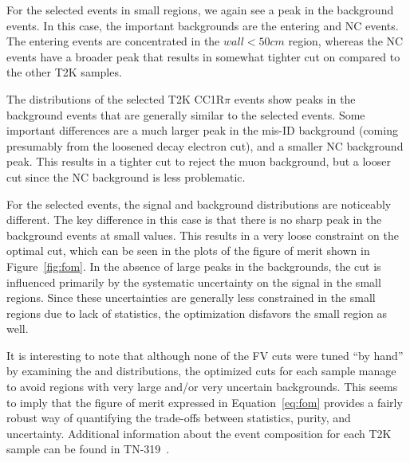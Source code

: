 For the selected \nue events in small \wall regions, we again see a peak in the
background events.  In this case, the important backgrounds are the entering and
NC events. The entering events are concentrated in the $wall < 50 cm$ region,
whereas the NC events have a broader peak that results in somewhat tighter cut
on \wall compared to the other T2K samples.

The distributions of the selected T2K \nue CC1R$\pi$ events show peaks in the
background events that are generally similar to the selected \nue events.  Some
important differences are a much larger peak in the mis-ID background (coming
presumably from the loosened decay electron cut), and a smaller NC background
peak.  This results in a tighter \towall cut to reject the muon background, but
a looser \wall cut since the NC background is less problematic.

For the selected \numu events, the signal and background distributions are
noticeably different.  The key difference in this case is that there is no
sharp peak in the background events at small \towall values.  This results in a
very loose constraint on the optimal \towall cut, which can be seen in the
plots of the figure of merit shown in Figure~\ref{fig:fom}.  In the absence of
large peaks in the backgrounds, the \numu \towall cut is influenced primarily by the
systematic uncertainty on the signal in the small \towall regions.  Since these
uncertainties are generally less constrained in the small \towall regions due
to lack of statistics, the optimization disfavors the small \towall region as
well.

It is interesting to note that although none of the FV cuts were tuned ``by
hand'' by examining the \towall and \wall distributions, the optimized cuts for
each sample manage to avoid regions with very large and/or very uncertain
backgrounds.  This seems to imply that the figure of merit expressed in
Equation~\ref{eq:fom} provides a fairly robust way of quantifying the
trade-offs between statistics, purity, and uncertainty.  Additional information
about the event composition for each T2K sample can be found in
TN-319~\cite{tn319}.

\FloatBarrier

